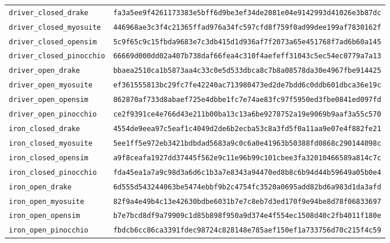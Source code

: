 \documentclass[11pt,a4paper]{article}
\begin{document}
\begin{center}\scriptsize
\begin{tabular}{ll}
\texttt{driver\_closed\_drake} & \texttt{fa3a5ee9f4261173383e5bff6d9be3ef34de2081e04e9142993d41026e3b87dc}\\
\texttt{driver\_closed\_myosuite} & \texttt{446968ae3c3f4c21365ffad976a34fc597cfd8f759f0ad99dee199af7830162f}\\
\texttt{driver\_closed\_opensim} & \texttt{5c9f65c9c15fbda9683e7c3db415d1d936af7f2073a65e451768f7ad6b60a145}\\
\texttt{driver\_closed\_pinocchio} & \texttt{66669d000dd02a407b738daf66fea4c310f4aefeff31043c5ec54ec0779a7a13}\\
\texttt{driver\_open\_drake} & \texttt{bbaea2510ca1b5873aa4c33c0e5d533dbca8c7b8a08578da30e4967fbe914425}\\
\texttt{driver\_open\_myosuite} & \texttt{ef361555813bc29fc7fe42240ac713980473ed2de7bdd6c0ddb601dbca36e19c}\\
\texttt{driver\_open\_opensim} & \texttt{862870af733d8abaef725e4dbbe1fc7e74ae83fc97f5950ed3fbe0841ed097fd}\\
\texttt{driver\_open\_pinocchio} & \texttt{ce2f9391ce4e766d43e211b00ba13c13a6be9278752a19e9069b9aaf3a55c570}\\
\texttt{iron\_closed\_drake} & \texttt{4554de9eea97c5eaf1c4049d2de6b2ecba53c8a3fd5f0a11aa9e07e4f882fe21}\\
\texttt{iron\_closed\_myosuite} & \texttt{5ee1ff5e972eb3421bdbdad5683a9c0c6a0e41963b50388fd0868c290144098c}\\
\texttt{iron\_closed\_opensim} & \texttt{a9f8ceafa1927dd37445f562e9c11e96b99c101cbee3fa32010466589a814c7c}\\
\texttt{iron\_closed\_pinocchio} & \texttt{fda45ea1a7a9c98d3a6d6c1b3a7e8343a94470ed8b8c6b94d44b59649a05b0e4}\\
\texttt{iron\_open\_drake} & \texttt{6d555d543244063be5474ebbf9b2c4754fc3520a0695add82bd6a983d1da3afd}\\
\texttt{iron\_open\_myosuite} & \texttt{82f9a4e49b4c13e42630bdbe6031b7e7c8eb7d3ed170f9e94be8d78f06833697}\\
\texttt{iron\_open\_opensim} & \texttt{b7e7bcd8df9a79909c1d85b898f950a9d374e4f554ec1508d40c2fb4011f180e}\\
\texttt{iron\_open\_pinocchio} & \texttt{fbdcb6cc86ca3391fdec98724c828148e785aef150ef1a733756d70c215f4c59}\\
\end{tabular}
\end{center}
\end{document}
